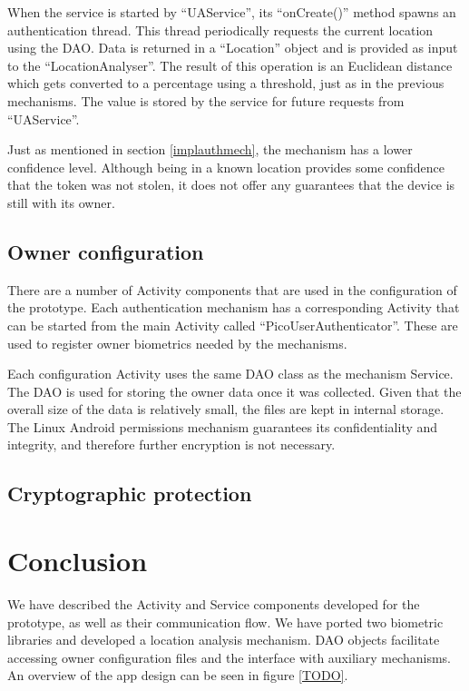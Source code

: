 When the service is started by ``UAService'', its ``onCreate()'' method spawns an authentication thread. This thread periodically requests the current location using the DAO. Data is returned in a ``Location'' object and is provided as input to the ``LocationAnalyser''. The result of this operation is an Euclidean distance which gets converted to a percentage using a threshold, just as in the previous mechanisms. The value is stored by the service for future requests from ``UAService''.

Just as mentioned in section \ref{implauthmech}, the mechanism has a lower confidence level. Although being in a known location provides some confidence that the token was not stolen, it does not offer any guarantees that the device is still with its owner.

\subsection{Owner configuration}
There are a number of Activity components that are used in the configuration of the prototype. Each authentication mechanism has a corresponding Activity that can be started from the main Activity called ``PicoUserAuthenticator''. These are used to register owner biometrics needed by the mechanisms.

Each configuration Activity uses the same DAO class as the mechanism Service. The DAO is used for storing the owner data once it was collected. Given that the overall size of the data is relatively small, the files are kept in internal storage. The Linux Android permissions mechanism guarantees its confidentiality and integrity, and therefore further encryption is not necessary.

\subsection{Cryptographic protection}

\section{Conclusion}
We have described the Activity and Service components developed for the prototype, as well as their communication flow. We have ported two biometric libraries and developed a location analysis mechanism. DAO objects facilitate accessing owner configuration files and the interface with auxiliary mechanisms. An overview of the app design can be seen in figure \ref{TODO}.

